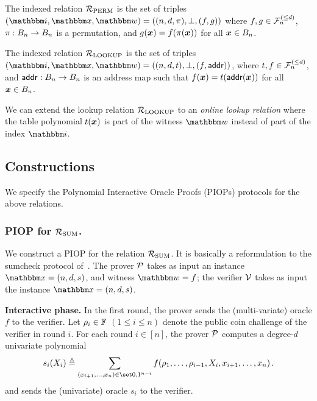 \begin{definition}
    The indexed relation ${\mathcal{R}}_{\text{PERM}}$ is the set of triples $(\idxR, \instR, \witR)=
    ((n, d, \perm), \bot, (f, g))$ where $f, g \in {\mathcal{F}}_{n}^{(\le{d})}$, $\pi : B_{n} \rightarrow B_{n}$
    is a permutation, and $g(\boldsymbol{x}) = f(\pi(\boldsymbol{x}))$ for all $\boldsymbol{x} \in B_{n}$.
\end{definition}

\begin{definition}
    The indexed relation ${\mathcal{R}}_{\text{LOOKUP}}$ is the set of triples $(\idxR, \instR, \witR)=
    ((n, d, t), \bot, (f, \addr))$, where $t, f \in {\mathcal{F}}_{n}^{(\le{d})}$,
    and $\mathsf{addr}: B_{n} \rightarrow B_{n}$ is an address map such that 
    $f(\boldsymbol{x}) = t(\mathsf{addr}(\boldsymbol{x}))$ for all $\boldsymbol{x} \in B_{n}$.
\end{definition}

\begin{remark}
    We can extend the lookup relation ${\mathcal{R}}_{\text{LOOKUP}}$ to an \emph{online lookup relation}
    where the table polynomial $t(\boldsymbol{x})$ is part of the witness $\witR$ 
    instead of part of the index $\idxR$.
\end{remark}

\subsection{Constructions}
We specify the Polynomial Interactive Oracle Proofs (PIOPs) protocols for the above relations.

\subsubsection*{PIOP for ${\mathcal{R}}_{\text{SUM}}$.} We construct a PIOP for 
the relation ${\mathcal{R}}_{\text{SUM}}$. It is basically a reformulation to the sumcheck protocol
of~\cite{LFKN92}.
The prover $\mathcal{P}$ takes as input an instance $\instR = (n, d, s)$,
and witness $\witR = f$; the verifier $\mathcal{V}$ takes as input the 
instance $\instR = (n, d, s)$.

\textbf{Interactive phase.} 
In the first round, the prover sends the (multi-variate) oracle $f$ to the verifier.
Let $\rho_{i} \in \mathbb{F}$ $(1 \le i \le n)$ denote the public coin challenge
of the verifier in round $i$.
For each round $i \in [n]$, the prover $\mathcal{P}$ computes a 
degree-$d$ univariate polynomial
\[
      s_i(X_i) \deq 
      \sum_{ (x_{i+1}, \dots, x_{n}) \in \zo^{n-i} } 
      f(\chal{1}, \dots, \chal{i-1}, X_i, x_{i+1}, \dots, x_n) \,.
\]
and sends the (univariate) oracle $s_i$ to the verifier.

